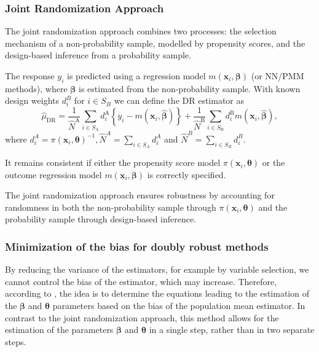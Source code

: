 \documentclass[
]{jss}
\begin{document}
\subsubsection{Joint Randomization
Approach}\label{joint-randomization-approach}

The joint randomization approach combines two processes: the selection
mechanism of a non-probability sample, modelled by propensity scores,
and the design-based inference from a probability sample.

The response \(y_i\) is predicted using a regression model
\(m(\boldsymbol{x}_i, \boldsymbol{\beta})\) (or NN/PMM methods), where
\(\boldsymbol{\beta}\) is estimated from the non-probability sample.
With known design weights \(d_i^B\) for \(i \in S_B\) we can define the
DR estimator as \begin{equation}
\label{dr}
\hat{\mu}_{\mathrm{DR}}=\frac{1}{\hat{N}^{\mathrm{A}}} \sum_{i \in S_{\mathrm{A}}} d_i^{\mathrm{A}}\left\{y_i-m\left(\boldsymbol{x}_i, \hat{\boldsymbol{\beta}}\right)\right\}+\frac{1}{\hat{N}^{\mathrm{B}}} \sum_{i \in S_{\mathrm{B}}} d_i^{\mathrm{B}} m\left(\boldsymbol{x}_i, \hat{\boldsymbol{\beta}}\right),
\end{equation} where
\(d_i^A=\pi\left(\boldsymbol{x}_i, \boldsymbol{\theta}\right)^{-1}, \hat{N}^A=\sum_{i \in S_A} d_i^A\)
and \(\hat{N}^B=\sum_{i \in S_B} d_i^B\).

It remains consistent if either the propensity score model
\(\pi(\boldsymbol{x}_i, \boldsymbol{\theta})\) or the outcome regression
model \(m(\boldsymbol{x}_i, \boldsymbol{\beta})\) is correctly
specified.

The joint randomization approach ensures robustness by accounting for
randomness in both the non-probability sample through
\(\pi(\boldsymbol{x}_i, \boldsymbol{\theta})\) and the probability
sample through design-based inference.

\subsubsection{Minimization of the bias for doubly robust
methods}\label{minimization-of-the-bias-for-doubly-robust-methods}

By reducing the variance of the estimators, for example by variable
selection, we cannot control the bias of the estimator, which may
increase. Therefore, according to \citet{yang_doubly_2020}, the idea is
to determine the equations leading to the estimation of the
\(\boldsymbol{\beta}\) and \(\boldsymbol{\theta}\) parameters based on
the bias of the population mean estimator. In contrast to the joint
randomization approach, this method allows for the estimation of the
parameters \(\boldsymbol{\beta}\) and \(\boldsymbol{\theta}\) in a
single step, rather than in two separate steps.
\end{document}
